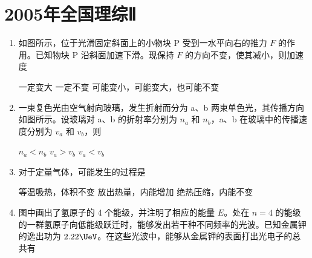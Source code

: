 \documentclass[\gkver]{gaokaozhenti}
\begin{document}
\chapter{2005年全国理综Ⅱ}

\begin{enumerate}
\item
如图所示，位于光滑固定斜面上的小物块 P 受到一水平向右的推力 $F$ 的作用。已知物块 P 沿斜面加速下滑。现保持 $F$ 的方向不变，使其减小，则加速度


{一定变大}
{一定不变}
{可能变小，可能变大，也可能不变}


\item
一束复色光由空气射向玻璃，发生折射而分为 a、b 两束单色光，其传播方向如图所示。设玻璃对 a、b 的折射率分别为 $n_{a}$ 和 $n_{b}$，a、b 在玻璃中的传播速度分别为 $v_{a}$ 和 $v_{b}$，则


{$n_{a}<n_{b}$}
{$v_{a}>v_{b}$}
{$v_{a}<v_{b}$}


\item
对于定量气体，可能发生的过程是

{等温吸热，体积不变}
{放出热量，内能增加}
{绝热压缩，内能不变}


\item
图中画出了氢原子的 4 个能级，并注明了相应的能量 $E$。处在 $n=4$ 的能级的一群氢原子向低能级跃迁时，能够发出若干种不同频率的光波。已知金属钾的逸出功为 $2.22\UeV$。在这些光波中，能够从金属钾的表面打出光电子的总共有


\end{enumerate}
\end{document}
